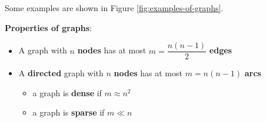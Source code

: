 \documentclass[english]{article}
\begin{document}
\bigskip
Some examples are shown in Figure \ref{fig:examples-of-graphs}.

\bigskip
\textbf{Properties of graphs}:
\begin{itemize}
  \item A graph with \(n\) \textbf{nodes} has at most \(m = \dfrac{n(n-1)}{2}\) \textbf{edges}
  \item A \textbf{directed} graph with \(n\) \textbf{nodes} has at most \(m = n(n-1)\) \textbf{arcs}
        \begin{itemize}
          \item a graph is \textbf{dense} if \(m \approx n^2\)
          \item a graph is \textbf{sparse} if \(m \ll n\)
        \end{itemize}
\end{itemize}
\end{document}
